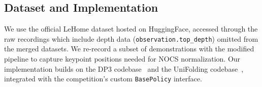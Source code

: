 \subsection{Dataset and Implementation}

We use the official LeHome dataset hosted on HuggingFace, accessed through the raw recordings which include depth data (\texttt{observation.top\_depth}) omitted from the merged datasets. We re-record a subset of demonstrations with the modified pipeline to capture keypoint positions needed for NOCS normalization. Our implementation builds on the DP3 codebase~\cite{ze2024dp3} and the UniFolding codebase~\cite{unifolding2023}, integrated with the competition's custom \texttt{BasePolicy} interface.
